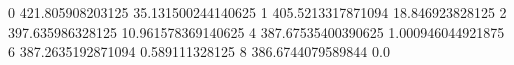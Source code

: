 0 421.805908203125 35.131500244140625
1 405.5213317871094 18.846923828125
2 397.635986328125 10.961578369140625
4 387.67535400390625 1.000946044921875
6 387.2635192871094 0.589111328125
8 386.6744079589844 0.0
